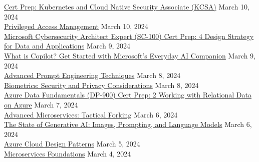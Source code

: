 \documentclass[10pt]{res} %
\begin{document}
\begin{resume}
\href{https://www.linkedin.com/learning/certificates/ac88cb0b95ba28cadf667d78a41743791734605a854a4e5fbead2ccaebe0f71a}{\color{blue}Cert Prep: Kubernetes and Cloud Native Security Associate (KCSA)} \hfill March 10, 2024 \\
\href{https://www.linkedin.com/learning/certificates/65f37e4f28892179e529c4c5d3a68b0f391b7fbcaa317bff59304cdb1e576d42}{\color{blue}Privileged Access Management} \hfill March 10, 2024 \\
\href{https://www.linkedin.com/learning/certificates/4294f946449d094c17363c6b7ea95593396da04d1bfedd5b46ce6c77b83c814e}{\color{blue}Microsoft Cybersecurity Architect Expert (SC-100) Cert Prep: 4 Design Strategy for Data and Applications} \hfill March 9, 2024 \\
\href{https://www.linkedin.com/learning/certificates/99b5968c0c599f5450b19757aa962b07aceef45fdf1b2948af7f3d23553e2660}{\color{blue}What is Copilot? Get Started with Microsoft's Everyday AI Companion} \hfill March 9, 2024 \\
\href{https://www.linkedin.com/learning/certificates/e0c1ba35076eb1736d6f930eda4fe17fc15cd2ec97b0a27da3585ee6162c372c}{\color{blue}Advanced Prompt Engineering Techniques} \hfill March 8, 2024 \\
\href{https://www.linkedin.com/learning/certificates/36f453d2c587c18057ce6d8469541f266e54578a226c3ed50675c40432dc72d1}{\color{blue}Biometrics: Security and Privacy Considerations} \hfill March 8, 2024 \\
\href{https://www.linkedin.com/learning/certificates/cadb009e53c800c5dc2095a18f8ab87d9117cbeb6c83f9a57bbae698b80abc66}{\color{blue}Azure Data Fundamentals (DP-900) Cert Prep: 2 Working with Relational Data on Azure} \hfill March 7, 2024 \\
\href{https://www.linkedin.com/learning/certificates/6e5c4352fc1d2b3dfda60b21764651deb99115ce4c9b6a892bf89ab6eee07116}{\color{blue}Advanced Microservices: Tactical Forking} \hfill March 6, 2024 \\
\href{https://www.linkedin.com/learning/certificates/16b05a8026bb5d7e9c816211ffaf32602f30a75be1cd560291f912308d203081}{\color{blue}The State of Generative AI: Images, Prompting, and Language Models} \hfill March 6, 2024 \\
\href{https://www.linkedin.com/learning/certificates/0e640367391e121ce63535683ce314c7a99e231d94520fab3d17e6768ae22c0e}{\color{blue}Azure Cloud Design Patterns} \hfill March 5, 2024 \\
\href{https://www.linkedin.com/learning/certificates/7811bcd5897b8ba677fe511c1a0da66afe2edc57b9f3bcca498ab728597b8f38}{\color{blue}Microservices Foundations} \hfill March 4, 2024 \\

\end{resume}
\end{document}

